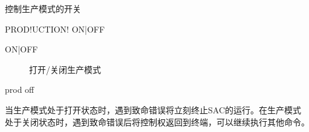 \label{cmd:production}

控制生产模式的开关

\begin{SACSTX}
PROD!UCTION! ON|OFF
\end{SACSTX}

\begin{description}
\item [ON|OFF] 打开/关闭生产模式
\end{description}

\begin{SACDFT}
prod off
\end{SACDFT}

当生产模式处于打开状态时，遇到致命错误将立刻终止SAC的运行。在生产模式
处于关闭状态时，遇到致命错误后将控制权返回到终端，可以继续执行其他命令。
